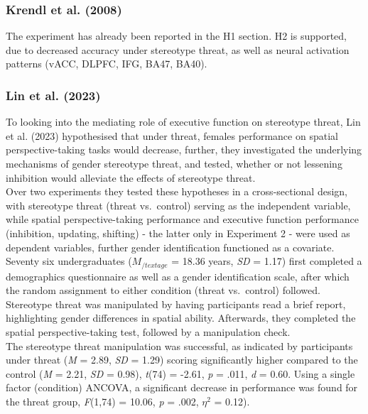 \documentclass[
  stu,floatsintext]{apa7}
\begin{document}
\subsubsection{Krendl et al. (2008)}\label{krendlnegativeconsequencesthreat2008-1}

The experiment has already been reported in the H1 section.
H2 is supported, due to decreased accuracy under stereotype threat, as well as neural activation patterns (vACC, DLPFC, IFG, BA47, BA40).

\subsubsection{Lin et al. (2023)}\label{lineffectstereotypethreat2023}

To looking into the mediating role of executive function on stereotype threat, Lin et al. (2023) hypothesised that under threat, females performance on spatial perspective-taking tasks would decrease, further, they investigated the underlying mechanisms of gender stereotype threat, and tested, whether or not lessening inhibition would alleviate the effects of stereotype threat.\\
Over two experiments they tested these hypotheses in a cross-sectional design, with stereotype threat (threat vs.~control) serving as the independent variable, while spatial perspective-taking performance and executive function performance (inhibition, updating, shifting) - the latter only in Experiment 2 - were used as dependent variables, further gender identification functioned as a covariate.
Seventy six undergraduates (\(M_{/text{age}}\) = 18.36 years, \emph{SD} = 1.17) first completed a demographics questionnaire as well as a gender identification scale, after which the random assignment to either condition (threat vs.~control) followed.
Stereotype threat was manipulated by having participants read a brief report, highlighting gender differences in spatial ability.
Afterwards, they completed the spatial perspective-taking test, followed by a manipulation check.\\
The stereotype threat manipulation was successful, as indicated by participants under threat (\emph{M} = 2.89, \emph{SD} = 1.29) scoring significantly higher compared to the control (\emph{M} = 2.21, \emph{SD} = 0.98), \emph{t}(74) = -2.61, \emph{p} = .011, \emph{d} = 0.60.
Using a single factor (condition) ANCOVA, a significant decrease in performance was found for the threat group, \emph{F}(1,74) = 10.06, \emph{p} = .002, \(\eta^{2}\) = 0.12).\\
\end{document}
